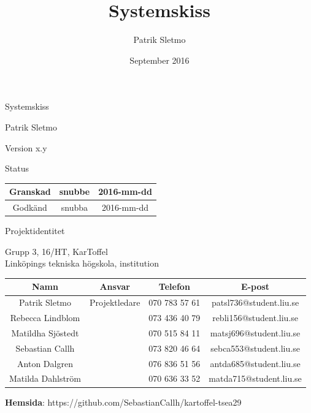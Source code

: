 \documentclass{article}
\title{Systemskiss}
\author{Patrik Sletmo}
\date{September 2016}
\begin{document}
\thispagestyle{empty}

{
\sffamily
\centering
\large


{\huge 
Systemskiss
}

{\large
Patrik Sletmo
}

{\large
Version x.y
}

\vspace{3.5cm}

Status
\begin{center}
\begin{tabular}{ | c | c | c | } 
\hline
Granskad & snubbe & 2016-mm-dd \\
\hline
Godkänd & snubba & 2016-mm-dd\\
\hline
\end{tabular}
\end{center}
}
\clearpage

\vspace*{\fill}
{
\sffamily
\centering
\large


{\huge
Projektidentitet
}

{\large
Grupp 3, 16/HT, KarToffel \\ Linköpings tekniska högskola, institution
}

\vspace{0.5cm}

\begin{table}[H]
\centering
\begin{tabular}{ | c | c | c | c |}
\hline
Namn & Ansvar & Telefon & E-post \\
\hline
Patrik Sletmo & Projektledare & 070 783 57 61 & patsl736@student.liu.se \\
\hline
Rebecca Lindblom &  & 073 436 40 79 & rebli156@student.liu.se \\
\hline
Matildha Sjöstedt &  & 070 515 84 11 & matsj696@student.liu.se \\
\hline
Sebastian Callh &  & 073 820 46 64 & sebca553@student.liu.se \\
\hline
Anton Dalgren &  & 076 836 51 56 & antda685@student.liu.se \\
\hline
Matilda Dahlström &  & 070 636 33 52 & matda715@student.liu.se \\
\hline
\end{tabular}
\end{table}
}

\begin{center}
\textbf{Hemsida}: https://github.com/SebastianCallh/kartoffel-tsea29
\end{center}
\end{document}
